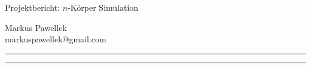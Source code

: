 {\LARGE\bfseries \begin{center}{Projektbericht: $n$-Körper Simulation}\end{center}}
\bigskip
\begin{minipage}[t][][c]{0.45\textwidth}
\end{minipage}
\hfill
\begin{minipage}[t][][c]{0.45\textwidth}
  \raggedright{Markus Pawellek \\ markuspawellek@gmail.com}
\end{minipage}
\bigskip
\bigskip
\hrule
\medskip
\begin{abstract}
  \itshape
  
\end{abstract}
\medskip
\hrule
\bigskip
\bigskip